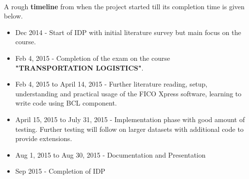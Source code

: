 \documentclass[a4paper, 12pt]{article}
\begin{document}
\noindent
\\
A rough \textbf{timeline} from when the project started till its completion time is given below.
\begin{itemize}
\item Dec 2014 - Start of IDP with initial literature survey but main focus on the course.
\item Feb 4, 2015 - Completion of the exam on the course \textbf{"TRANSPORTATION LOGISTICS"}.
\item Feb 4, 2015 to April 14, 2015 - Further literature reading, setup, understanding and practical usage of the FICO Xpress software, learning to write code using BCL component.
\item April 15, 2015 to July 31, 2015 - Implementation phase with good amount of testing. Further testing will follow on larger datasets with additional code to provide extensions.
\item Aug 1, 2015 to Aug 30, 2015 - Documentation and Presentation
\item Sep 2015 - Completion of IDP
\end{itemize}
\end{document}

